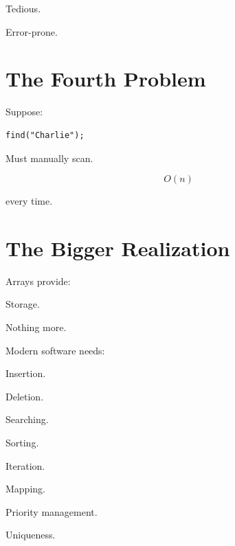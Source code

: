 \documentclass[11pt,a4paper]{book}
\begin{document}
Tedious.


Error-prone.


\section{The Fourth Problem}

Suppose:

\begin{verbatim} 
find("Charlie");
\end{verbatim}


Must manually scan.


\[
O(n)
\]


every time.


\section{The Bigger Realization}

Arrays provide:


Storage.


Nothing more.


Modern software needs:


Insertion.

Deletion.

Searching.

Sorting.

Iteration.

Mapping.

Priority management.

Uniqueness.
\end{document}
